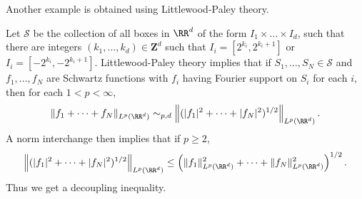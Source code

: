 Another example is obtained using Littlewood-Paley theory.

\begin{theorem}
  Let $\mathcal{S}$ be the collection of all boxes in $\RR^d$ of the form $I_1 \times \dots \times I_d$, such that there are integers $(k_1, \dots, k_d) \in \mathbf{Z}^d$ such that $I_i = [2^{k_i}, 2^{k_i+1}]$ or $I_i = [-2^{k_i}, -2^{k_i+1}]$. Littlewood-Paley theory implies that if $S_1, \dots, S_N \in \mathcal{S}$ and $f_1, \dots, f_N$ are Schwartz functions with $f_i$ having Fourier support on $S_i$ for each $i$, then for each $1 < p < \infty$,
  \[ \| f_1 + \dots + f_N \|_{L^p(\RR^d)} \sim_{p,d} \left\|(|f_1|^2 + \dots + |f_N|^2)^{1/2} \right\|_{L^p(\RR^d)}. \]
  A norm interchange then implies that if $p \geq 2$,
  \[ \left\|(|f_1|^2 + \dots + |f_N|^2)^{1/2} \right\|_{L^p(\RR^d)} \leq \left( \| f_1 \|_{L^p(\RR^d)}^2 + \dots + \| f_N \|_{L^p(\RR^d)}^2 \right)^{1/2}. \]
  Thus we get a decoupling inequality.
\end{theorem}



\begin{comment}
\begin{example}
  TODO: Move this. When $p < 2$, one does not usually expect to find decoupling inequalities in $L^p(\Omega)$. For instance, for any family of disjoint measurable sets $E_1, \dots, E_N \in \Omega$, each with non-negative measure, one can find $f_1, \dots, f_N \in L^p(\Omega)$, with $f_i$ supported on $E_i$ for each $i$ such that
  \begin{align*}
    \| f_1 + \dots + f_N \|_{L^p(\Omega)} &= \left( \| f_1 \|_{L^p(\Omega)}^p + \dots + \| f_N \|_{L^p(\Omega)}^p \right)^{1/p}\\
    &\geq N^{1/p - 1/2} \left( \| f_1 \|_{L^p(\Omega)}^2 + \dots + \| f_N \|_{L^p(\Omega)}^2 \right)^{1/2}.
  \end{align*}
  The idea of this is simple; we just choose a family of scalars $A_1, \dots, A_N$ such that
  \[ (A_1^p + \dots + A_N^p)^{1/p} = N^{1/p - 1/2} (A_1^2 + \dots + A_N^2)^{1/2}. \]
  Given functions $f_1, \dots, f_N$ such that $f_i$ is supported in $E_i$ for each $i$, we need only rescale each function such that $\| f_i \|_{L^p(\Omega)} = A_i$ for each $i$. Similarily, if $U_1, \dots, U_N$ are disjoint open sets in $\RR^d$, we can find Schwartz functions $f_1, \dots, f_N$, such that $f_i$ has Fourier support in $U_i$ for each $i$, such that
  \[ \| f_1 + \dots + f_N \|_{L^p(\Omega)} \gtrsim N^{1/p - 1/2} \left( \| f_1 \|_{L^p(\Omega)}^2 + \dots + \| f_N \|_{L^p(\Omega)}^2 \right)^{1/2}, \]
  where the implict constant is independant of $N$, and $U_1, \dots, U_N$. The idea here is to begin with Schwarz functions $f_1, \dots, f_N$ such that $f_i$ has Fourier suppport in $U_i$, and then replace these Schwarz functions with translations such that the masses of the $f_i$ are essentially disjoint from one another, which only modulates the Fourier transform and so does not affect the Fourier support of the functions. Rescaling then gives the result.
\end{example}
\end{comment}

